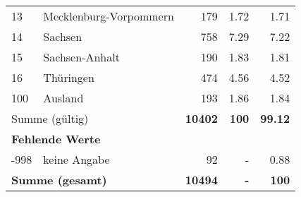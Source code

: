 \begin{longtable}{lXrrr}
     13 &
     \multicolumn{1}{X}{ Mecklenburg-Vorpommern   } &


       \num{179} &
       \num[round-mode=places,round-precision=2]{1,72} &
         \num[round-mode=places,round-precision=2]{1,71} \\

     14 &
     \multicolumn{1}{X}{ Sachsen   } &


       \num{758} &
       \num[round-mode=places,round-precision=2]{7,29} &
         \num[round-mode=places,round-precision=2]{7,22} \\

     15 &
     \multicolumn{1}{X}{ Sachsen-Anhalt   } &


       \num{190} &
       \num[round-mode=places,round-precision=2]{1,83} &
         \num[round-mode=places,round-precision=2]{1,81} \\

     16 &
     \multicolumn{1}{X}{ Thüringen   } &


       \num{474} &
       \num[round-mode=places,round-precision=2]{4,56} &
         \num[round-mode=places,round-precision=2]{4,52} \\

     100 &
     \multicolumn{1}{X}{ Ausland   } &


       \num{193} &
       \num[round-mode=places,round-precision=2]{1,86} &
         \num[round-mode=places,round-precision=2]{1,84} \\
     \midrule
     \multicolumn{2}{l}{Summe (gültig)} &
       \textbf{\num{10402}} &
     \textbf{100} &
       \textbf{\num[round-mode=places,round-precision=2]{99,12}} \\
     \multicolumn{5}{l}{\textbf{Fehlende Werte}}\\
       -998 &
       keine Angabe &
         \num{92} &
        - &
         \num[round-mode=places,round-precision=2]{0,88} \\
     \midrule
     \multicolumn{2}{l}{\textbf{Summe (gesamt)}} &
          \textbf{\num{10494}} &
        \textbf{-} &
        \textbf{100} \\
     \bottomrule
     \end{longtable}
     

